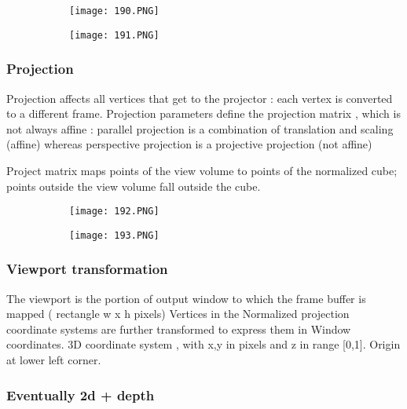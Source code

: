 \documentclass{article}
\begin{document}
\begin{figure}[ht!]
  \centering
  \begin{subfigure}[b]{0.4\linewidth}
    \texttt{[image: 190.PNG]}
  \end{subfigure}
  \begin{subfigure}[b]{0.4\textwidth}
         \centering
         \texttt{[image: 191.PNG]}
     \end{subfigure}
\end{figure}

\subsubsection{Projection}
Projection affects all vertices that get to the projector : each vertex is converted to a different frame.
Projection parameters define the projection matrix , which is not always affine : parallel projection is a combination of translation and scaling (affine) whereas perspective projection is a projective projection (not affine)

Project matrix maps points of the view volume to points of the normalized cube; points outside the view volume fall outside the cube.

\begin{figure}[ht!]
  \centering
  \begin{subfigure}[b]{0.4\linewidth}
    \texttt{[image: 192.PNG]}
  \end{subfigure}
  \begin{subfigure}[b]{0.4\textwidth}
         \centering
         \texttt{[image: 193.PNG]}
     \end{subfigure}
\end{figure}

\subsubsection{Viewport transformation}

The viewport is the portion of output window to which the frame buffer is mapped ( rectangle w x h pixels)
Vertices in the Normalized projection coordinate systems are further transformed to express them in Window coordinates.
3D coordinate system , with x,y in pixels and z in range [0,1].
Origin at lower left corner.

\subsubsection{Eventually 2d + depth}
\end{document}
